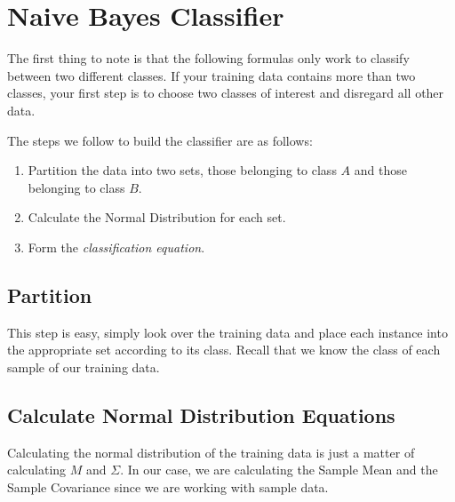 \documentclass{article}
\begin{document}

\section{Naive Bayes Classifier}
\label{sec:nbayes}

The first thing to note is that the following formulas only work to
classify between two different classes.  If your training data
contains more than two classes, your first step is to choose two
classes of interest and disregard all other data.

The steps we follow to build the classifier are as follows:

\begin{enumerate}

\item Partition the data into two sets, those belonging to class $A$
  and those belonging to class $B$.

\item Calculate the Normal Distribution for each set.

\item Form the \emph{classification equation}.

\end{enumerate}

\subsection{Partition}

This step is easy, simply look over the training data and place each
instance into the appropriate set according to its class.  Recall that
we know the class of each sample of our training data.

\subsection{Calculate Normal Distribution Equations}

Calculating the normal distribution of the training data is just a
matter of calculating $M$ and $\Sigma$.  In our case, we are
calculating the Sample Mean and the Sample Covariance\footnotemark
{} since we are working
with sample data.
\end{document}
